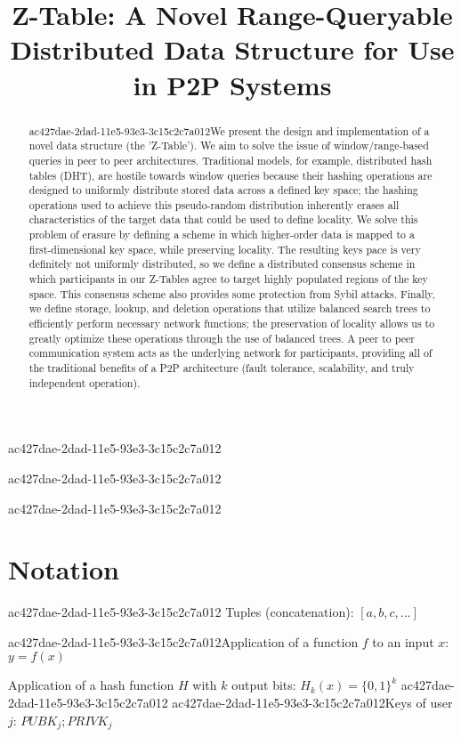 \documentclass[12pt]{article}
\title{Z-Table: A Novel Range-Queryable Distributed Data Structure for Use in P2P Systems}
\begin{document}
ac427dae-2dad-11e5-93e3-3c15c2c7a012\maketitle

ac427dae-2dad-11e5-93e3-3c15c2c7a012\begin{abstract}
ac427dae-2dad-11e5-93e3-3c15c2c7a012We present the design and implementation of a novel data structure (the 'Z-Table'). We aim to solve the issue of window/range-based queries in peer to peer architectures. Traditional models, for example,  distributed hash tables (DHT), are hostile towards window queries because their hashing operations are designed to uniformly distribute stored data across a defined key space; the hashing operations used to achieve this pseudo-random distribution inherently erases all characteristics of the target data that could be used to define locality. We solve this problem of erasure by defining a scheme in which higher-order data is mapped to a first-dimensional key space, while preserving locality. The resulting keys pace is very definitely not uniformly distributed, so we define a distributed consensus scheme in which participants in our Z-Tables agree to target highly populated regions of the key space. This consensus scheme also provides some protection from Sybil attacks. Finally, we define storage, lookup, and deletion operations that utilize balanced search trees to efficiently perform necessary network functions; the preservation of locality allows us to greatly optimize these operations through the use of balanced trees. A peer to peer communication system acts as the underlying network for participants, providing all of the traditional benefits of a P2P architecture (fault tolerance, scalability, and truly independent operation).
\end{abstract}

ac427dae-2dad-11e5-93e3-3c15c2c7a012\section{Notation}
ac427dae-2dad-11e5-93e3-3c15c2c7a012
Tuples (concatenation): $[a,b,c,...]$

ac427dae-2dad-11e5-93e3-3c15c2c7a012Application of a function $f$ to an input $x$: $y=f(x)$

Application of a hash function $H$ with $k$ output bits: $H_{k}(x) = \{0,1\}^k$
ac427dae-2dad-11e5-93e3-3c15c2c7a012
ac427dae-2dad-11e5-93e3-3c15c2c7a012Keys of user $j$: $ PUBK_j; PRIVK_j $
\end{document}
